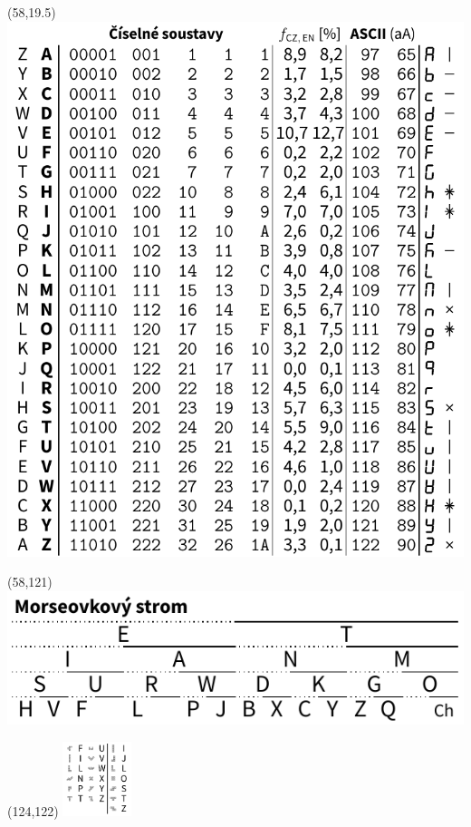 \documentclass{extarticle}
\begin{document}
\begin{textblock}{0}(58,19.5)%
\vfill
{\includegraphics[scale=0.7]{tools/numbers-table.pdf}}
\vfill
\end{textblock}

\begin{textblock}{0}(58,121)%
\vfill
{\includegraphics[scale=0.7]{tools/morse-tree.pdf}}
\vfill
\end{textblock}

\begin{textblock}{0}(124,122)%
\vfill
{\includegraphics[width=20mm]{tools/xmino.pdf}}
\vfill
\end{textblock}
\end{document}
